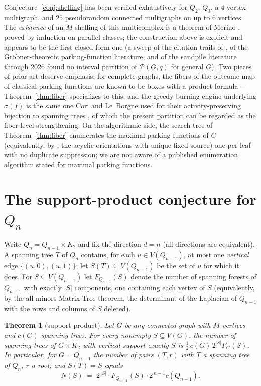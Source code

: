 \documentclass[11pt]{amsart}
\newtheorem{theorem}{Theorem}[section]
\theoremstyle{definition}
\newcommand{\PF}{\mathcal{P}}
\begin{document}
Conjecture~\ref{conj:shelling} has been verified exhaustively for $Q_2$,
$Q_3$, a $4$-vertex multigraph, and $25$ pseudorandom connected multigraphs
on up to $6$ vertices. The \emph{existence} of an $M$-shelling of this
multicomplex is a theorem of Merino \cite[Thm.~5.8]{merino01}, proved by
induction on parallel classes; the construction above is explicit and
appears to be the first closed-form one (a sweep of the citation trails of
\cite{merino01,chari}, of the Gr\"obner-theoretic parking-function
literature, and of the sandpile literature through 2026 found no interval
partition of $\PF(G,q)$ for general $G$). Two pieces of prior art deserve
emphasis: for complete graphs, the fibers of the outcome map of classical
parking functions are known to be boxes with a product formula
\cite[Prop.~3.3]{colmenarejo} --- Theorem~\ref{thm:fiber} specializes to
this; and the greedy-burning engine underlying $\sigma(f)$ is the same one
Cori and Le~Borgne used for their activity-preserving bijection to spanning
trees \cite{corilb}, of which the present partition can be regarded as the
fiber-level strengthening. On the algorithmic side, the search tree of
Theorem~\ref{thm:fiber} enumerates the maximal parking functions of $G$
(equivalently, by \cite[Thm.~3.1]{bct}, the acyclic orientations with unique
fixed source) one per leaf with no duplicate suppression; we are not aware
of a published enumeration algorithm stated for maximal parking functions.

\section{The support-product conjecture for $Q_n$}

Write $Q_n = Q_{n-1} \times K_2$ and fix the direction $d=n$ (all directions
are equivalent). A spanning tree $T$ of $Q_n$ contains, for each
$u \in V(Q_{n-1})$, at most one \emph{vertical} edge
$\{(u,0),(u,1)\}$; let $S(T) \subseteq V(Q_{n-1})$ be the set of $u$ for
which it does. For $S \subseteq V(Q_{n-1})$ let $F_{Q_{n-1}}(S)$ denote the
number of spanning forests of $Q_{n-1}$ with exactly $|S|$ components, one
containing each vertex of $S$ (equivalently, by the all-minors Matrix-Tree
theorem, the determinant of the Laplacian of $Q_{n-1}$ with the rows and
columns of $S$ deleted).

\begin{theorem}[support product]\label{conj:support}
Let $G$ be any connected graph with $M$ vertices and $c(G)$ spanning trees.
For every nonempty $S \subseteq V(G)$, the number of spanning trees of
$G \times K_2$ with vertical support exactly $S$ is
$\tfrac{1}{2}\,c(G)\, 2^{|S|} F_G(S)$. In particular, for $G = Q_{n-1}$ the
number of pairs $(T,r)$ with $T$ a spanning tree of $Q_n$, $r$ a root, and
$S(T)=S$ equals
\[
  N(S) \;=\; 2^{\,|S|}\cdot F_{Q_{n-1}}(S)\cdot 2^{\,n-1} c(Q_{n-1}).
\]
\end{theorem}
\end{document}
